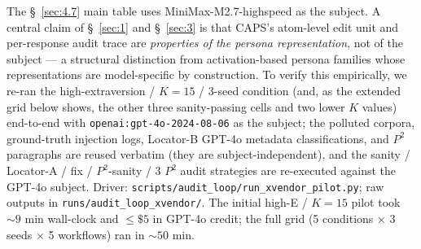 The \S~\ref{sec:4.7} main table uses MiniMax-M2.7-highspeed as the subject. A central claim of \S~\ref{sec:1} and \S~\ref{sec:3} is that CAPS's atom-level edit unit and per-response audit trace are \textit{properties of the persona representation}, not of the subject --- a structural distinction from activation-based persona families whose representations are model-specific by construction. To verify this empirically, we re-ran the high-extraversion / $K=15$ / 3-seed condition (and, as the extended grid below shows, the other three sanity-passing cells and two lower $K$ values) end-to-end with \texttt{openai:gpt-\allowbreak{}4o-\allowbreak{}2024-\allowbreak{}08-\allowbreak{}06} as the subject; the polluted corpora, ground-truth injection logs, Locator-B GPT-4o metadata classifications, and $P^{\!2}$ paragraphs are reused verbatim (they are subject-independent), and the sanity / Locator-A / fix / $P^{\!2}$-sanity / 3 $P^{\!2}$ audit strategies are re-executed against the GPT-4o subject. Driver: \texttt{scripts/\allowbreak{}audit\_\allowbreak{}loop/\allowbreak{}run\_\allowbreak{}xvendor\_\allowbreak{}pilot.py}; raw outputs in \texttt{runs/\allowbreak{}audit\_\allowbreak{}loop\_\allowbreak{}xvendor/\allowbreak{}}. The initial high-E / $K=15$ pilot took $\sim 9$ min wall-clock and $\leq \$5$ in GPT-4o credit; the full grid (5 conditions $\times$ 3 seeds $\times$ 5 workflows) ran in $\sim 50$ min.

